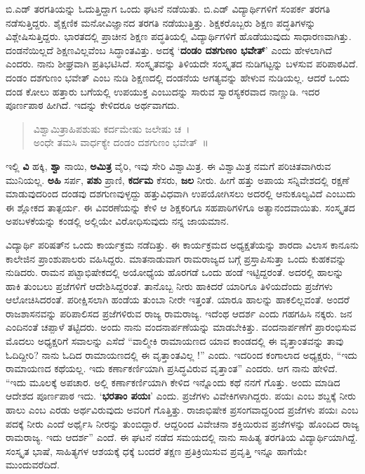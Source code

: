 {ಬಿ.ಎಡ್ ತರಗತಿಯನ್ನು ಓದುತ್ತಿದ್ದಾಗ ಒಂದು ಘಟನೆ ನಡೆಯಿತು.  ಬಿ.ಎಡ್ ವಿದ್ಯಾರ್ಥಿಗಳಿಗೆ ಸಂಪರ್ಕ ತರಗತಿ ನಡೆಸುತ್ತಿದ್ದರು. ಶೈಕ್ಷಣಿಕ ಮನೋವಿಜ್ಞಾನದ \hbox{ತರಗತಿ} ನಡೆಯುತ್ತಿತ್ತು.  ಶಿಕ್ಷಕರೊಬ್ಬರು ಶಿಕ್ಷಣ ಪದ್ಧತಿಗಳನ್ನು ವಿಶ್ಲೇಷಿಸುತ್ತಿದ್ದರು.  \hbox{ಭಾರತದಲ್ಲಿ} ಪ್ರಾಚೀನ ಶಿಕ್ಷಣ ಪದ್ಧತಿಯಲ್ಲಿ ವಿದ್ಯಾರ್ಥಿಗಳಿಗೆ ಹೊಡೆಯುವುದು \hbox{ಸಾಧಾರಣವಾಗಿತ್ತು.} ದಂಡನೆಯಿಲ್ಲದೆ ಶಿಕ್ಷಣವಿಲ್ಲವೆಂಬ ಸಿದ್ಧಾಂತವಿತ್ತು.  ಅದಕ್ಕೆ ‘\textbf{ದಂಡಂ ದಶಗುಣಂ ಭವೇತ್}’ ಎಂದು ಹೇಳಲಾಗಿದೆ ಎಂದರು.  ನಾನು ಶೀಘ್ರವಾಗಿ ಪ್ರತಿಭಟಿಸಿದೆ.  ಸಂಸ್ಕೃತ\-ವನ್ನು ತಿಳಿಯದೇ ಸಂಸ್ಕೃತದ ನುಡಿಗಟ್ಟನ್ನು ಬಳಸುವ ಪರಿಪಾಠವಿದೆ.  ದಂಡಂ ದಶಗುಣಂ ಭವೇತ್ ಎಂಬ ನುಡಿ ಶಿಕ್ಷಣದಲ್ಲಿ ದಂಡನೆಯ ಅಗತ್ಯವನ್ನು ಹೇಳುವ ನುಡಿಯಲ್ಲ.  ಆದರೆ ಒಂದು ದಂಡ  \enginline{-}  ಕೋಲು ಹತ್ತಾರು ಬಗೆಯಲ್ಲಿ ಉಪಯುಕ್ತ ಎಂಬುದನ್ನು ಸಾರುವ ಸ್ವಾರಸ್ಯಕರವಾದ ನಾಣ್ಣುಡಿ.  ಇದರ ಪೂರ್ಣಪಾಠ \hbox{ಹೀಗಿದೆ.}  ಇದನ್ನು ಕೇಳಿದರೂ ಅರ್ಥವಾಗದು. 
\begin{verse}
ವಿಶ್ವಾಮಿತ್ರಾಹಿಪಶುಷು ಕರ್ದಮೇಷು ಜಲೇಷು ಚ~।\\
ಅಂಧೇ ತಮಸಿ ವಾರ್ಧಕ್ಯೇ ದಂಡಂ ದಶಗುಣಂ ಭವೇತ್~॥
\end{verse}
ಇಲ್ಲಿ \textbf{ವಿ}  \enginline{-}  ಹಕ್ಕಿ, \textbf{ಶ್ವಾ}  \enginline{-}  ನಾಯಿ, \textbf{ಅಮಿತ್ರ}  \enginline{-}  ವೈರಿ, ಇವು ಸೇರಿ ವಿಶ್ವಾಮಿತ್ರ.  ಈ ವಿಶ್ವಾಮಿತ್ರ ನಮಗೆ ಪರಿಚಿತವಾಗಿರುವ ಮುನಿಯಲ್ಲ.  \textbf{ಅಹಿ}   \enginline{-}   ಸರ್ಪ, \textbf{ಪಶು}   \enginline{-}   ಪ್ರಾಣಿ, \textbf{ಕರ್ದಮ}   \enginline{-}   ಕೆಸರು, \textbf{ಜಲ}   \enginline{-}   ನೀರು.  ಹೀಗೆ ಹತ್ತು ಅಪಾಯ ಸನ್ನಿವೇಶದಲ್ಲಿ ರಕ್ಷಣೆ ಮಾಡುವುದರಿಂದ ದಂಡವು ದಶಗುಣವುಳ್ಳದ್ದು   \enginline{-}   ಹತ್ತುವಿಧವಾಗಿ ಉಪಯೋಗಿಸಲು ಅದರಲ್ಲಿ ಆನುಕೂಲ್ಯವಿದೆ ಎಂಬುದು ಈ ಶ್ಲೋಕದ ತಾತ್ಪರ್ಯ.   ಈ ವಿವರಣೆಯನ್ನು ಕೇಳಿ ಆ ಶಿಕ್ಷಕರಿಗೂ ಸಹಪಾಠಿಗಳಿಗೂ ಅತ್ಯಾನಂದವಾಯಿತು.  ಸಂಸ್ಕೃತದ ಅಪಬಳಕೆಯನ್ನು ಕಂಡಲ್ಲಿ ಅಲ್ಲಿಯೇ ವಿರೋಧಿಸುವುದು ನನ್ನ ಜಾಯಮಾನ.  

ವಿದ್ಯಾರ್ಥಿ ಪರಿಷತ್‍ನ ಒಂದು ಕಾರ್ಯಕ್ರಮ ನಡೆದಿತ್ತು.  ಈ ಕಾರ್ಯಕ್ರಮದ ಅಧ್ಯಕ್ಷತೆ\-ಯನ್ನು ಶಾರದಾ ವಿಲಾಸ ಕಾನೂನು ಕಾಲೇಜಿನ ಪ್ರಾಂಶುಪಾಲರು ವಹಿಸಿದ್ದರು.  ಮಾತನಾಡುವಾಗ ರಾಮರಾಜ್ಯದ ಬಗ್ಗೆ ಪ್ರಸ್ತಾಪಿಸುತ್ತಾ ಒಂದು ಕುಹಕವನ್ನು ನುಡಿದರು.  ರಾಮನ ಪಟ್ಟಾಭಿಷೇಕದಲ್ಲಿ ಅಯೋಧ್ಯೆಯ ಹೊರಗಡೆ ಒಂದು ಹಂಡೆ ಇಟ್ಟಿದ್ದ\-ರಂತೆ.  ಅದರಲ್ಲಿ ಹಾಲನ್ನು ಹಾಕಿ ತುಂಬಲು ಪ್ರಜೆಗಳಿಗೆ ಆದೇಶಿಸಿದ್ದರಂತೆ.  ತಾನೊಬ್ಬ ನೀರು ಹಾಕಿದರೆ ಯಾರಿಗೂ ತಿಳಿಯದೆಂದು ಪ್ರಜೆಗಳು ಆಲೋಚಿಸಿದರಂತೆ. ಪರೀಕ್ಷಿ\-ಸಲಾಗಿ ಹಂಡೆಯ ತುಂಬಾ ನೀರೇ ಇತ್ತಂತೆ.  ಯಾರೂ ಹಾಲನ್ನು ಹಾಕಲಿಲ್ಲವಂತೆ.  ಅಂದರೆ ರಾಜಶಾಸನವನ್ನು ಪರಿಪಾಲಿಸದ ಪ್ರಜೆಗಳಿರುವ ರಾಜ್ಯ ರಾಮರಾಜ್ಯ.  ಇದೆಂಥ ಆದರ್ಶ ಎಂದು ಗಹಗಹಿಸಿ ನಕ್ಕರು.  ಜನ ಎಂದಿನಂತೆ ಚಪ್ಪಾಳೆ ತಟ್ಟಿದರು.  ಅಂದು ನಾನು ವಂದನಾರ್ಪಣೆಯನ್ನು ಮಾಡಬೇಕಿತ್ತು.  ವಂದನಾರ್ಪಣೆಗೆ ಪ್ರಾರಂಭಿಸುವ ಮೊದಲು ಅಧ್ಯಕ್ಷರಿಗೆ ಸವಾಲನ್ನು ಎಸೆದೆ  “ವಾಲ್ಮೀಕಿ ರಾಮಾಯಣದ ಯಾವ ಕಾಂಡದಲ್ಲಿ ಈ ವೃತ್ತಾಂತವನ್ನು ತಾವು ಓದಿದ್ದೀರಿ?  ನಾನು ಓದಿದ ರಾಮಾಯಣದಲ್ಲಿ ಈ ವೃತ್ತಾಂತವಿಲ್ಲ !” ಎಂದು.  ಇದರಿಂದ ಕಂಗಾಲಾದ ಅಧ್ಯಕ್ಷರು, “ಇದು ರಾಮಾಯಣದ ಕಥೆಯಲ್ಲ. ಇದು ಕರ್ಣಾಕರ್ಣಿಯಾಗಿ ಪ್ರಸಿದ್ಧವಿರುವ ವೃತ್ತಾಂತ” ಎಂದರು.  ಆಗ ನಾನು ಹೇಳಿದೆ.  “ಇದು ಮೂಲಕ್ಕೆ ಅಪಚಾರ.  ಅಲ್ಲಿ ಕರ್ಣಾಕರ್ಣಿಯಾಗಿ ಕೇಳಿದ ಇನ್ನೊಂದು ಕಥೆ ನನಗೆ ಗೊತ್ತು. ಅಂದು ಮಾಡಿದ ಆದೇಶದ ಪೂರ್ಣಪಾಠ ಇದು.  ‘\textbf{ಭರತಾಂ ಪಯಃ}’ ಎಂದು.  ಪ್ರಜೆಗಳು ವಿವೇಕಿಗಳಾಗಿದ್ದರು.  ಪಯಃ ಎಂಬ ಶಬ್ದಕ್ಕೆ ನೀರು ಹಾಲು ಎಂಬ ಎರಡು ಅರ್ಥವಿರುವುದು ಅವರಿಗೆ ಗೊತ್ತಿತ್ತು.  ರಾಜಾಭಿಷೇಕ ಪ್ರಸಂಗವಾದ್ದರಿಂದ ಪ್ರಜೆಗಳು ಪಯಃ ಎಂಬ ಪದಕ್ಕೆ ನೀರು ಎಂದೆ ಅರ್ಥೈಸಿ ನೀರನ್ನು ತುಂಬಿದ್ದಾರೆ. ಆದ್ದರಿಂದ ವಿವೇಚನಾ ಶಕ್ತಿಯಿರುವ ಪ್ರಜೆಗಳನ್ನು ಹೊಂದಿದ ರಾಜ್ಯ ರಾಮರಾಜ್ಯ.  ಇದು ಆದರ್ಶ” ಎಂದೆ.  ಈ ಘಟನೆ ನಡೆದ ಸಮಯದಲ್ಲಿ ನಾನು ಸಾಹಿತ್ಯ ತರಗತಿಯ ವಿದ್ಯಾರ್ಥಿ\-ಯಾಗಿದ್ದೆ.  ಸಂಸ್ಕೃತ ಭಾಷೆ, ಸಾಹಿತ್ಯಗಳ ಆಶಯಕ್ಕೆ ಧಕ್ಕೆ ಬಂದರೆ ತಕ್ಷಣ ಪ್ರತಿಕ್ರಿಯಿಸುವ ಪ್ರವೃತ್ತಿ ಇನ್ನೂ ಹಾಗೆಯೇ ಮುಂದುವರೆದಿದೆ.   

}
